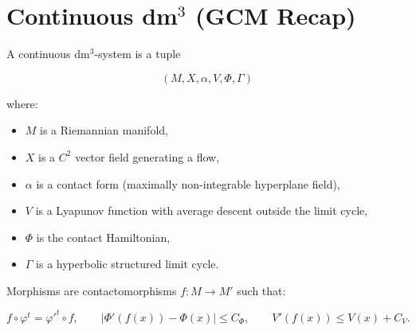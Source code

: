 \documentclass[11pt]{article}
\title{\textbf{Language Specification: The Unified Generative Framework}\\
\large TOGT + GCM + dm$^3_{\mathrm{disc}}$\

\[4pt]
\large \emph{Discrete Generative Contact Mechanics (dm$^3_{\mathrm{disc}}$)}\\
\large A Formal Lift of the dm$^3$ Category to Arithmetic Dynamical Systems}
\author{Pablo Nogueira Grossi (Independent Researcher)}
\date{v1.0 --- April 2026}
\begin{document}
\maketitle

\begin{abstract}
This note provides the precise ``language-first'' specification requested by the
Collatz supplement (TOGT Report, pp.~108--109). It synthesizes:
\begin{itemize}
  \item the continuous dm$^3$ framework of the GCM Manifesto (\S2.2),
  \item the Topographical Orthogonal Generative Theory (TOGT) operator algebra
        $G = U \circ F \circ K \circ C$,
  \item the discrete lift dm$^3_{\mathrm{disc}}$ formalized in Lean~4
        (\texttt{DiscreteDm3.lean} v1.5).
\end{itemize}
The result is a single higher-order category in which both smooth contact flows
and piecewise-linear arithmetic maps (such as the Collatz map) are objects.
The Collatz conjecture is thereby reduced to a pure membership problem inside
this category.
\end{abstract}

\section{Continuous dm$^3$ (GCM Recap)}

A continuous dm$^3$-system is a tuple


\[
(M, X, \alpha, V, \Phi, \Gamma)
\]


where:
\begin{itemize}
  \item $M$ is a Riemannian manifold,
  \item $X$ is a $C^2$ vector field generating a flow,
  \item $\alpha$ is a contact form (maximally non-integrable hyperplane field),
  \item $V$ is a Lyapunov function with average descent outside the limit cycle,
  \item $\Phi$ is the contact Hamiltonian,
  \item $\Gamma$ is a hyperbolic structured limit cycle.
\end{itemize}

Morphisms are contactomorphisms $f : M \to M'$ such that:


\[
f \circ \varphi^t = \varphi'^t \circ f,\qquad
|\Phi'(f(x)) - \Phi(x)| \le C_\Phi,\qquad
V'(f(x)) \le V(x) + C_V.
\]
\end{document}
